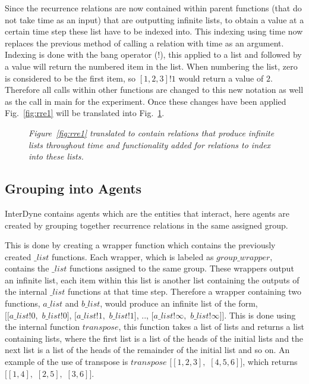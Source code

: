 \documentclass{article}
\begin{document}
Since the recurrence relations are now contained within parent functions (that do not take time as an input) that are outputting infinite lists, to obtain a value at a certain time step these list have to be indexed into. This indexing using time now replaces the previous method of calling a relation with time as an argument. Indexing is done with the bang operator ($!$), this applied to a list and followed by a value will return the numbered item in the list. When numbering the list, zero is considered to be the first item, so $[1,2,3]!1$ would return a value of $2$. Therefore all calls within other functions are changed to this new notation as well as the call in main for the experiment. Once these changes have been applied Fig.~\ref{fig:rre1} will be translated into Fig.~\ref{fig:ts1}.
\begin{figure}[H]
	\centering
	
	\caption{\it Figure~\ref{fig:rre1} translated to contain relations that produce infinite lists throughout time and functionality added for relations to index into these lists.}
	\label{fig:ts1}
\end{figure} 




\subsection{Grouping into Agents}
InterDyne contains agents which are the entities that interact, here agents are created by grouping together recurrence relations in the same assigned group.  

This is done by creating a wrapper function which contains the previously created $\_list$ functions. Each wrapper, which is labeled as $group\_wrapper$, contains the $\_list$ functions assigned to the same group. These wrappers output an infinite list, each item within this list is another list containing the outputs of the internal $\_list$ functions at that time step. Therefore a wrapper containing two functions, $a\_list$ and $b\_list$, would produce an infinite list of the form,\\
$[[a\_list!0,$ $b\_list!0]$, $[a\_list!1,$ $b\_list!1]$, .., $[a\_list!\infty,$ $b\_list!\infty]]$. This is done using the internal function $transpose$, this function takes a list of lists and returns a list containing lists, where the first list is a list of the heads of the initial lists and the next list is a list of the heads of the remainder of the initial list and so on. An example of the use of transpose is $transpose$ $[[1,2,3],$ $[4,5,6]]$, which returns $[[1,4],$ $[2,5],$ $[3,6]]$.
\end{document}
